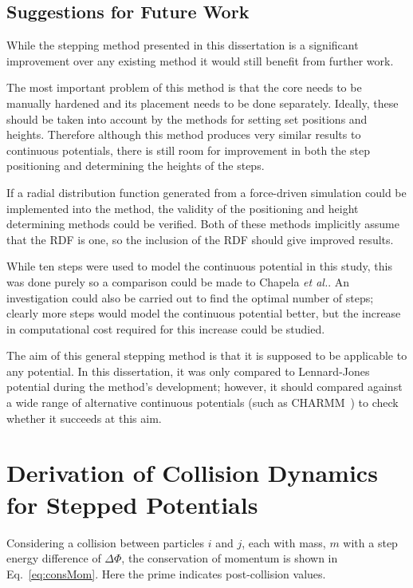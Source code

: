 \documentclass[12pt]{UoAthesis} \usepackage{booktabs}
\begin{document}
\section{Suggestions for Future Work}

While the stepping method presented in this dissertation is a
significant improvement over any existing method it would still
benefit from further work.

The most important problem of this method is that the core needs to
be manually hardened and its placement needs to be done separately.
Ideally, these should be taken into account by the methods for setting
set positions and heights.  Therefore although this method produces
very similar results to continuous potentials, there is still room for
improvement in both the step positioning and determining the heights
of the steps.  

If a radial distribution function generated from a force-driven
simulation could be implemented into the method, the validity of the
positioning and height determining methods could be verified.  Both of
these methods implicitly assume that the RDF is one, so the inclusion
of the RDF should give improved results.

While ten steps were used to model the continuous potential in this
study, this was done purely so a comparison could be made to Chapela
\textit{et al.}.  An investigation could also be carried out to find
the optimal number of steps; clearly more steps would model the
continuous potential better, but the increase in computational cost
required for this increase could be studied.

The aim of this general stepping method is that it is supposed to be
applicable to any potential.  In this dissertation, it was only
compared to Lennard-Jones potential during the method's development;
however, it should compared against a wide range of alternative
continuous potentials (such as CHARMM~\cite{MacKerell1998}) to check
whether it succeeds at this aim.
\printbibliography[heading=thesisChapterBib] 
\appendix
\chapter{Derivation of Collision Dynamics for Stepped Potentials }
\label{app:derivation}
Considering a collision between particles $i$ and $j$, each with mass,
$m$ with a step energy difference of $\Delta \Phi$, the conservation of
momentum is shown in Eq.~\eqref{eq:consMom}. Here the prime
indicates post-collision values.
\end{document}
